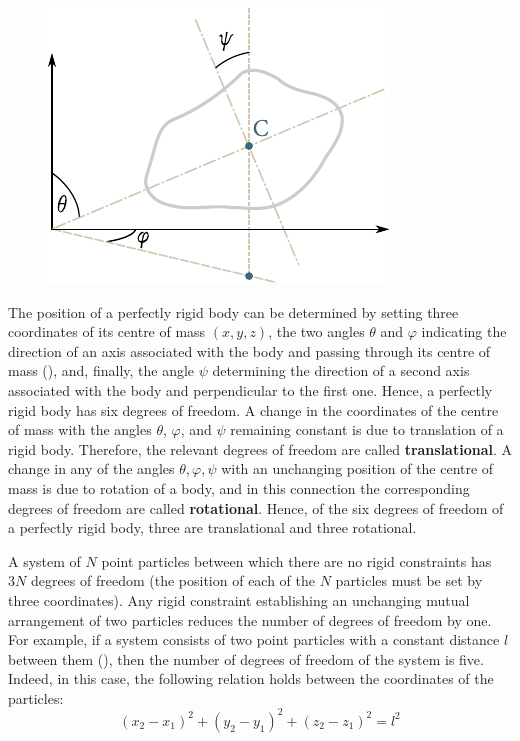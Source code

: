 \begin{figure}[t]
	\begin{center}
		\includegraphics[scale=1.0]{figures/ch_11/fig_11_8.pdf}
		\caption[]{}
		\label{fig:11_8}
	\end{center}
	\vspace{-0.8cm}
\end{figure}

The position of a perfectly rigid body can be determined by setting three coordinates of its centre of mass $(x, y, z)$, the two angles $\theta$ and $\varphi$ indicating the direction of an axis associated with the body and passing through its centre of mass (), and, finally, the angle $\psi$ determining the direction of a second axis associated with the body and perpendicular to the first one. Hence, a perfectly rigid body has six degrees of freedom. A change in the coordinates of the centre of mass with the angles $\theta$, $\varphi$, and $\psi$ remaining constant is due to translation of a rigid body. Therefore, the relevant degrees of freedom are called \textbf{translational}. A change in any of the angles $\theta, \varphi, \psi$ with an unchanging position of the centre of mass is due to rotation of a body, and in this connection the corresponding degrees of freedom are called \textbf{rotational}. Hence, of the six degrees of freedom of a perfectly rigid body, three are translational and three rotational.

A system of $N$ point particles between which there are no rigid constraints has $3N$ degrees of freedom (the position of each of the $N$ particles must be set by three coordinates). Any rigid constraint establishing an unchanging mutual arrangement of two particles reduces the number of degrees of freedom by one. For example, if a system consists of two point particles with a constant distance $l$ between them (), then the number of degrees of freedom of the system is five. Indeed, in this case, the following relation holds between the coordinates of the particles:
\begin{equation}\label{eq:11_33}
	(x_2 - x_1)^2 + (y_2 - y_1)^2 + (z_2 - z_1)^2 = l^2
\end{equation}


